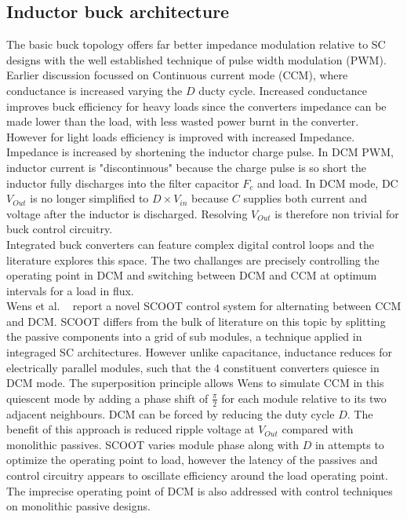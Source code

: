 \documentclass[letterpaper,twocolumn,10pt]{article}
\begin{document}
\subsection{Inductor buck architecture}
The basic buck topology offers far better impedance modulation relative to SC designs with the well established technique of pulse width modulation (PWM). Earlier discussion focussed on Continuous current mode (CCM), where conductance is increased varying the $D$ ducty cycle. Increased conductance improves buck efficiency for heavy loads since the converters impedance can be made lower than the load, with less wasted power burnt in the converter.\\
However for light loads efficiency is improved with increased Impedance. Impedance is increased by shortening the inductor charge pulse. In DCM PWM, inductor current is "discontinuous" because the charge pulse is so short the inductor fully discharges into the filter capacitor $F_c$ and load. In DCM mode, DC $V_{Out}$ is no longer simplified to $D \times V_{in}$ because $C$ supplies both current and voltage after the inductor is discharged. Resolving $V_{Out}$ is therefore non trivial for buck control circuitry.\\
\indent Integrated buck converters can feature complex digital control loops and the literature explores this space. The two challanges are precisely controlling the operating point in DCM and switching between DCM and CCM at optimum intervals for a load in flux.\\
Wens et al. ~\cite{Wens2011} report a novel SCOOT control system for alternating between CCM and DCM. SCOOT differs from the bulk of literature on this topic by splitting the passive components into a grid of sub modules, a technique applied in integraged SC architectures. However unlike capacitance, inductance reduces for electrically parallel modules, such that the 4 constituent converters quiesce in DCM mode. The superposition principle allows Wens to simulate CCM in this quiescent mode by adding a phase shift of $\frac{\pi}{2}$ for each module relative to its two adjacent neighbours. DCM can be forced by reducing the duty cycle $D$. The benefit of this approach is reduced ripple voltage at $V_{Out}$ compared with monolithic passives. SCOOT varies module phase along with $D$ in attempts to optimize the operating point to load, however the latency of the passives and control circuitry appears to oscillate efficiency around the load operating point.\\
The imprecise operating point of DCM is also addressed with control techniques on monolithic passive designs.\\
\end{document}
